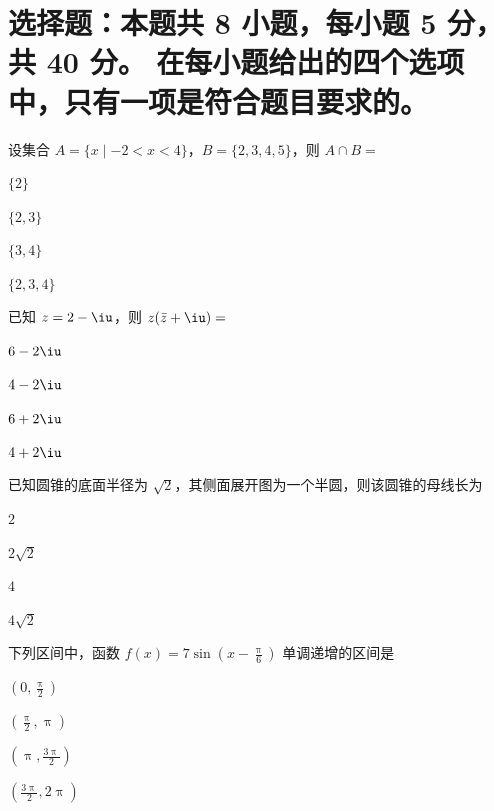 \documentclass{exam-zh}
\begin{document}
\section{%
  选择题：本题共 8 小题，每小题 5 分，共 40 分。
  在每小题给出的四个选项中，只有一项是符合题目要求的。
}

\begin{question}[points = 2]
  设集合 $A = \{x \mid -2 < x < 4\}$，$B = \{2, 3, 4, 5\}$，则 $A \cap B = $ \paren[]

  \begin{choices}
    \item $\{2\}$
    \item $\{2, 3\}$
    \item $\{3, 4\}$
    \item $\{2, 3, 4\}$
  \end{choices}
\end{question}

\begin{question}
  已知 $z = 2 - \iu$，则 $z (\bar{z} + \iu) = $ \paren
  \begin{choices}
    \item $6 - 2\iu$
    \item $4 - 2\iu$
    \item $6 + 2\iu$
    \item $4 + 2\iu$
  \end{choices}
\end{question}

\begin{question}
  已知圆锥的底面半径为 $\sqrt{2}$，其侧面展开图为一个半圆，则该圆锥的母线长为 \paren
  \begin{choices}
    \item $2$
    \item $2 \sqrt{2}$
    \item $4$
    \item $4 \sqrt{2}$
  \end{choices}
\end{question}

\begin{question}
  下列区间中，函数 $f(x) = 7 \sin \left( x - \frac{\uppi}{6} \right)$ 单调递增的区间是 \paren
  \begin{choices}
    \item $\left( 0               , \frac{\uppi}{2}  \right)$
    \item $\left( \frac{\uppi}{2} , \uppi            \right)$
    \item $\left( \uppi           , \frac{3\uppi}{2} \right)$
    \item $\left( \frac{3\uppi}{2}, 2\uppi           \right)$
  \end{choices}
\end{question}
\end{document}
